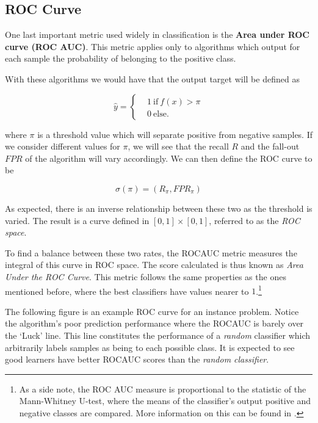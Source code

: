 \begin{itemize}
\end{itemize}



\subsection{ROC Curve}

One last important metric used widely in classification is the \textbf{Area under ROC curve (ROC AUC)}. This metric applies only to algorithms which output for each sample the probability of belonging to the positive class.

With these algorithms we would have that the output target will be defined as

\begin{equation}
\hat{y} =
\begin{cases}
&1 \ \mbox{if} \ f(x) > \pi \\
&0 \ \mbox{else}.
\end{cases}
\end{equation}

where $\pi$ is a threshold value which will separate positive from negative samples. If we consider different values for $\pi$, we will see that the recall $R$ and the fall-out $FPR$ of the algorithm will vary accordingly. We can then define the ROC curve to be

\begin{equation}
\sigma(\pi) = (R_\pi, FPR_\pi)
\end{equation}

As expected, there is an inverse relationship between these two as the threshold is varied. The result is a curve defined in $[0,1]\times[0,1]$, referred to as the \textit{ROC space}.

To find a balance between these two rates, the ROCAUC metric measures the integral of this curve in ROC space. The score calculated is thus known as \textit{Area Under the ROC Curve}. This metric follows the same properties as the ones mentioned before, where the best classifiers have values nearer to $1$.\footnote{As a side note, the ROC AUC measure is proportional to the statistic of the Mann-Whitney U-test, where the means of the classifier's output positive and negative classes are compared. More information on this can be found in \textcite{mason-rocAucRelationship}.}



The following figure is an example ROC curve for an instance problem. Notice the algorithm's poor prediction performance where the ROCAUC is barely over the `Luck' line. This line constitutes the performance of a \textit{random} classifier which arbitrarily labels samples as being to each possible class. It is expected to see good learners have better ROCAUC scores than the \textit{random classifier}.

